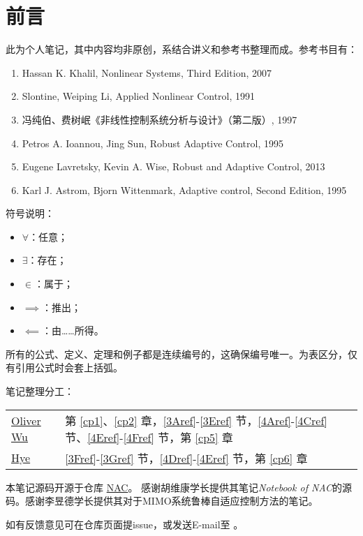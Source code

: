 \chapter*{前言}
此为个人笔记，其中内容均非原创，系结合讲义和参考书整理而成。参考书目有：
\begin{enumerate}
    \item Hassan K. Khalil, Nonlinear Systems, Third Edition, 2007
    \item Slontine, Weiping Li, Applied   Nonlinear    Control, 1991
    \item 冯纯伯、费树岷《非线性控制系统分析与设计》（第二版）, 1997
    \item Petros A. Ioannou, Jing Sun, Robust Adaptive Control, 1995
    \item Eugene Lavretsky, Kevin A. Wise, Robust and Adaptive Control, 2013
    \item Karl J. Astrom, Bjorn Wittenmark, Adaptive control, Second Edition, 1995
\end{enumerate}

符号说明：
\begin{itemize}
    \item $\forall$：任意；
    \item $\exists$：存在；
    \item $\in$：属于；
    \item $\implies$：推出；
    \item $\impliedby$：由……所得。
\end{itemize}

所有的公式、定义、定理和例子都是连续编号的，这确保编号唯一。为表区分，仅有引用公式时会套上括弧。

笔记整理分工：
\begin{table*}[htbp]
  \centering
  \setcellgapes{4pt}
  \makegapedcells
  \begin{tabular}{p{2.0cm}p{12.0cm}}
    \hline
    \href{https://github.com/OliverWu515}{Oliver Wu} & 第 \ref{cp1}、\ref{cp2} 章，\ref{3Aref}-\ref{3Eref} 节，\ref{4Aref}-\ref{4Cref} 节、\ref{4Eref}-\ref{4Fref} 节，第 \ref{cp5} 章\\
    \href{https://github.com/Co-ding-Man}{Hye} & \ref{3Fref}-\ref{3Gref} 节，\ref{4Dref}-\ref{4Eref} 节，第 \ref{cp6} 章\\
    \hline
  \end{tabular}
\end{table*}

本笔记源码开源于仓库 \href{https://github.com/OliverWu515/NAC}{NAC}。
感谢胡维康学长提供其笔记{\it Notebook of NAC}的源码。感谢李昱德学长提供其对于MIMO系统鲁棒自适应控制方法的笔记。

如有反馈意见可在仓库页面提issue，或发送E-mail至 。